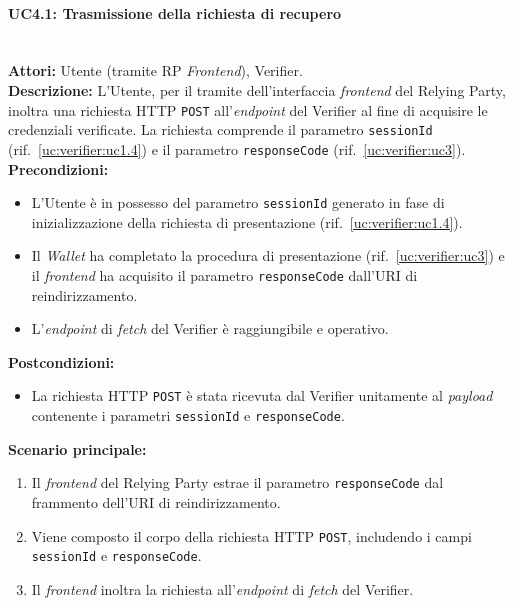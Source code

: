 \paragraph{\large\bfseries UC4.1: Trasmissione della richiesta di recupero}
\label{uc:verifier:uc4.1}
\mbox{}\\
\noindent\textbf{Attori:} Utente (tramite RP \textit{Frontend}), Verifier.
\\
\noindent\textbf{Descrizione:} L'Utente, per il tramite dell'interfaccia \textit{frontend} del Relying Party, inoltra una richiesta HTTP \texttt{POST} all'\textit{endpoint} del Verifier al fine di acquisire le credenziali verificate. La richiesta comprende il parametro \texttt{sessionId} (rif.\ \ref{uc:verifier:uc1.4}) e il parametro \texttt{responseCode} (rif.\ \ref{uc:verifier:uc3}).
\\
\noindent\textbf{Precondizioni:}
\begin{itemize}
    \item L'Utente è in possesso del parametro \texttt{sessionId} generato in fase di inizializzazione della richiesta di presentazione (rif.\ \ref{uc:verifier:uc1.4}).
    \item Il \textit{Wallet} ha completato la procedura di presentazione (rif.\ \ref{uc:verifier:uc3}) e il \textit{frontend} ha acquisito il parametro \texttt{responseCode} dall'URI di reindirizzamento.
    \item L'\textit{endpoint} di \textit{fetch} del Verifier è raggiungibile e operativo.
\end{itemize}
\noindent\textbf{Postcondizioni:}
\begin{itemize}
    \item La richiesta HTTP \texttt{POST} è stata ricevuta dal Verifier unitamente al \textit{payload} contenente i parametri \texttt{sessionId} e \texttt{responseCode}.
\end{itemize}

\noindent\textbf{Scenario principale:}
\begin{enumerate}
    \item Il \textit{frontend} del Relying Party estrae il parametro \texttt{responseCode} dal frammento dell'URI di reindirizzamento.
    \item Viene composto il corpo della richiesta HTTP \texttt{POST}, includendo i campi \texttt{sessionId} e \texttt{responseCode}.
    \item Il \textit{frontend} inoltra la richiesta all'\textit{endpoint} di \textit{fetch} del Verifier.
\end{enumerate}

